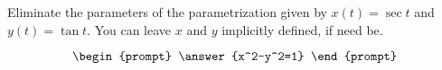\documentclass{ximera}
\author{Gregory Hartman \and Matthew Carr}
\begin{document}
\begin{exercise}




Eliminate the parameters of the parametrization given by $x(t)=\sec t$ and $y(t)=\tan t$. You can leave $x$ and $y$ implicitly defined, if need be.

\[
\begin{prompt}
\answer{x^2-y^2=1}
\end{prompt}
\]

\end{exercise}
\end{document}
